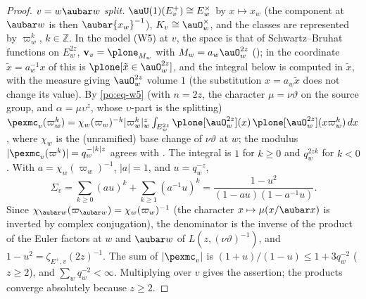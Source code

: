 \documentclass[10pt]{amsart}
\theoremstyle{definition}
\theoremstyle{remark}
\newcommand{\Z}{\mathbb Z}
\providecommand{\psvac}{\mathbf v}
\begin{document}
\begin{proof}
\emph{$v=w\aubar w$ split.} $\auU(1)(E^+_v)\cong E_w^\times$ by $x\mapsto x_w$ (the component at
$\aubar w$ is then $\aubar{x_w}^{-1}$), $K_v\cong\auO_w^\times$, and the classes are represented by
$\varpi_w^k$, $k\in\Z$. In the model (W5) at $v$, the space is that of Schwartz--Bruhat functions
on $E_w^{2z}$, $\psvac_v=\plone_{M_w}$ with $M_w=a_w\auO_w^{2z}$ ({\cite[Lemma~6.30]{P53}}); in the
coordinate $\tilde x=a_w^{-1}x$ of {\cite[Lemma~6.32]{P53}} this is $\plone[\tilde x\in\auO_w^{2z}]$, and
the integral below is computed in $\tilde x$, with the measure giving $\auO_w^{2z}$ volume $1$ (the
substitution $x=a_w\tilde x$ does not change its value). By \eqref{po:eq-w5} (with $n=2z$, the character
$\mu=\nu\vartheta$ on the source group, and $\alpha=\mu\upsilon^z$, whose $\upsilon$-part is the
splitting) $\pexmc_v(\varpi_w^k)=\chi_w(\varpi_w)^{-k}|\varpi_w^k|_w^{z}\int_{E_w^{2z}}\plone[\auO_w^{2z}](x)
\,\plone[\auO_w^{2z}](x\varpi_w^k)\,dx$, where $\chi_w$ is the (unramified) base change of
$\nu\vartheta$ at $w$; the modulus $|\pexmc_v(\varpi^k)|=q_w^{-|k|z}$ agrees with
{\cite[Lemma~2.11(a)]{P53}}. The integral is $1$ for $k\ge0$ and $q_w^{2zk}$ for $k<0$. With
$a=\chi_w(\varpi_w)^{-1}$, $|a|=1$, and $u=q_w^{-z}$,
\[
\Sigma_v=\sum_{k\ge0}(au)^k+\sum_{k\ge1}(a^{-1}u)^k=\frac{1-u^2}{(1-au)(1-a^{-1}u)} .
\]
Since $\chi_{\aubar w}(\varpi_{\aubar w})=\chi_w(\varpi_w)^{-1}$ (the character $x\mapsto\mu(x/\aubar x)$
is inverted by complex conjugation), the denominator is the inverse of the product of the Euler
factors at $w$ and $\aubar w$ of $L(z,(\nu\vartheta)^{-1})$, and $1-u^2=\zeta_{E^+,v}(2z)^{-1}$. The
sum of $|\pexmc_v|$ is $(1+u)/(1-u)\le1+3q_w^{-2}$ ($z\ge2$), and $\sum_wq_w^{-2}<\infty$.
Multiplying over $v$ gives the assertion; the products converge absolutely because $z\ge2$.
\end{proof}
\end{document}
